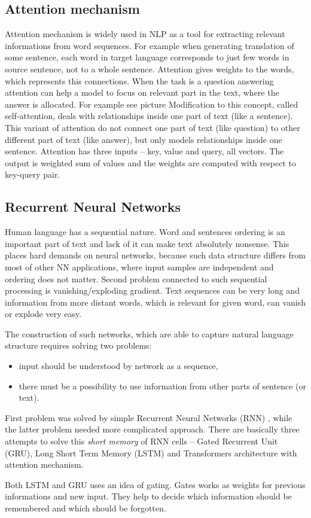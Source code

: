 \subsection{Attention mechanism}
\label{sub:attention}
Attention mechanism is widely used in NLP as a tool for extracting relevant informations from word sequences. For example when generating translation of some sentence, each word in target language corresponds to just few words in source sentence, not to a whole sentence. Attention gives weights to the words, which represents this connections. When the task is a question answering %
attention can help a model to focus on relevant part in the text, where the answer is allocated. For example see picture %
Modification to this concept, called self-attention, deals with relationships inside one part of text (like a sentence). This variant of attention do not connect one part of text (like question) to other different part of text (like answer), but only models relationships inside one sentence. %
Attention has three inputs -- key, value and query, all vectors. The output is weighted sum of values and the weights are computed with respect to key-query pair. 


\subsection{Recurrent Neural Networks}
Human language has a sequential nature. Word and sentences ordering is an important part of text and lack of it can make text absolutely nonsense. This places hard demands on neural networks, because such data structure differs from most of other NN applications, where input samples are independent and ordering does not matter. Second problem connected to such sequential processing is vanishing/exploding gradient. %
Text sequences can be very long and information from more distant words, which is relevant for given word, can vanish or explode very easy. %

The construction of such networks, which are able to capture natural language structure requires solving two problems:
\begin{itemize}
\item input should be understood by network as a sequence,
\item there must be a possibility to use information from other parts of sentence (or text).
\end{itemize}
 First problem was solved by simple Recurrent Neural Networks (RNN) %
, while the latter problem needed more complicated approach. There are basically three attempts to solve this \textit{short memory} of RNN cells -- Gated Recurrent Unit (GRU), Long Short Term Memory (LSTM) and Transformers architecture with attention mechanism.
\par
Both LSTM and GRU uses an idea of gating. Gates works as weights for previous informations and new input. They help to decide which information should be remembered and which should be forgotten. %
